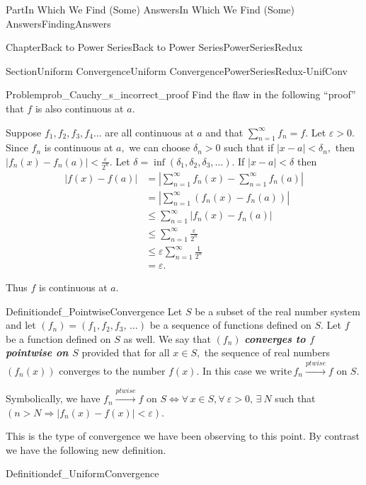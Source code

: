 \documentclass[oneside,10pt,]{book}
\newcommand{\alert}[1]{\textbf{\textit{#1}}}
\numberwithin{equation}{part}
\newcommand{\abs}[1]{\left|#1\right|}
\newcommand{\eps}{\varepsilon}
\newcommand{\ptwise}{\stackrel{ptwise}{\longrightarrow}}
\newcommand{\lt}{<}
\newcommand{\amp}{&}
\begin{document}
\begin{partptx}{Part}{In Which We Find (Some) Answers}{}{In Which We Find (Some) Answers}{}{}{FindingAnswers}
\begin{chapterptx}{Chapter}{Back to Power Series}{}{Back to Power Series}{}{}{PowerSeriesRedux}
\begin{sectionptx}{Section}{Uniform Convergence}{}{Uniform Convergence}{}{}{PowerSeriesRedux-UnifConv}
\begin{problem}{Problem}{}{prob_Cauchy_s_incorrect_proof}%
 Find the flaw in the following ``proof'' that \(f\) is also continuous at \(a\).%
\par
Suppose \(f_1, f_2, f_3, f_4 \ldots\) are all continuous at \(a\) and that \(\sum_{n=1}^\infty f_n=f\).  Let \(\eps>0\).  Since \(f_n\) is continuous at \(a,\) we can choose \(\delta_n>0\) such that if \(\abs{x-a}\lt
\delta_n,\) then \(\abs{f_n(x)-f_n(a)}\lt
\frac{\eps}{2^n}\).  Let \(\delta=\inf(\delta_1,\delta_2,\delta_3,\ldots)\).  If \(\abs{x-a}\lt \delta\) then%
\begin{align*}
\abs{f(x)-f(a)} \amp =  \abs{\sum_{n=1}^\infty f_n(x)  -  \sum_{n=1}^\infty f_n(a) }\\
\amp = \abs{\sum_{n=1}^\infty \left(f_n(x)-f_n(a)\right) }\\
\amp \le \sum_{n=1}^\infty \abs{f_n(x)-f_n(a) }\\
\amp \le \sum_{n=1}^\infty \frac{\eps}{2^n}\\
\amp \le \eps\sum_{n=1}^\infty \frac{1}{2^n}\\
\amp =   \eps.
\end{align*}
%
\par
Thus \(f\) is continuous at \(a\).%
\end{problem}
\begin{definition}{Definition}{}{def_PointwiseConvergence}%
 Let \(S\) be a subset of the real number system and let \(\left(f_n\right)=\left(f_1,f_2,f_3,\,\ldots\right)\) be a sequence of functions defined on \(S\).  Let \(f\) be a function defined on \(S\) as well.  We say that \(\left(f_n\right)\) \alert{converges to \(f\) pointwise on \(S\)} provided that for all \(x\in
S,\) the sequence of real numbers \(\left(f_n(x)\right)\) converges to the number \(f(x)\).  In this case we write\(\,f_n\ptwise f\) on \(S\).%
\end{definition}
Symbolically, we have \(f_n\ptwise f\text{ on }
S\Leftrightarrow \forall\,x\in S,\forall\ \eps>0,\,\exists\
N\) such that \(\left(n>N \Rightarrow|f_n(x)-f(x)|\lt
\eps\right)\).%
\par
This is the type of convergence we have been observing to this point.  By contrast we have the following new definition.%
\begin{definition}{Definition}{}{def_UniformConvergence}%

\end{definition}
\end{sectionptx}
\end{chapterptx}
\end{partptx}
\end{document}
